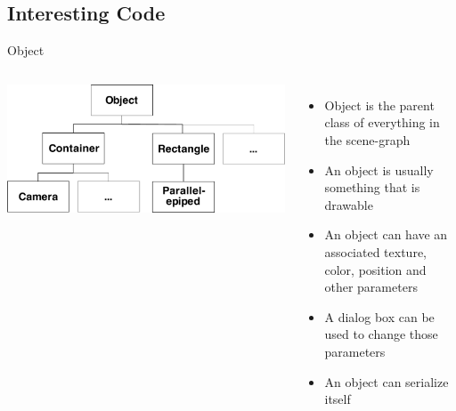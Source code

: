 \documentclass[12pt,ucs,hyperref={pdftext}]{beamer}
\newlength{\columnleft}
\newlength{\columnright}
\begin{document}
\subsection{Interesting Code}

\begin{frame}{Object}
\begin{columns}

\column{\columnleft}

\begin{center}
\includegraphics[width= \columnleft]{media/object.pdf}
\end{center}

\column{\columnright}
\begin{itemize}%
\item Object is the parent class of everything in the scene-graph
\item An object is usually something that is drawable
\item An object can have an associated texture, color, position and other parameters
\item A dialog box can be used to change those parameters
\item An object can serialize itself
\end{itemize}

\end{columns}
\end{frame}
\end{document}
